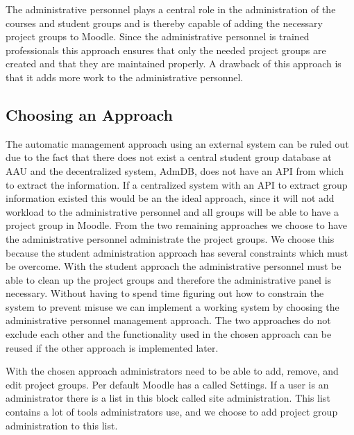 The administrative personnel plays a central role in the administration of the courses and student groups and is thereby capable of adding the necessary project groups to Moodle. 
Since the administrative personnel is trained professionals this approach ensures that only the needed project groups are created and that they are maintained properly. 
A drawback of this approach is that it adds more work to the administrative personnel.


\subsection{Choosing an Approach}
The automatic management approach using an external system can be ruled out due to the fact that there does not exist a central student group database at AAU and the decentralized system, AdmDB, does not have an API from which to extract the information.
If a centralized system with an API to extract group information existed this would be an the ideal approach, since it will not add workload to the administrative personnel and all groups will be able to have a project group in Moodle. 
From the two remaining approaches we choose to have the administrative personnel administrate the project groups. 
We choose this because the student administration approach has several constraints which must be overcome. 
With the student approach the administrative personnel must be able to clean up the project groups and therefore the administrative panel is necessary.
Without having to spend time figuring out how to constrain the system to prevent misuse we can implement a working system by choosing the administrative personnel management approach.
The two approaches do not exclude each other and the functionality used in the chosen approach can be reused if the other approach is implemented later.

With the chosen approach administrators need to be able to add, remove, and edit project groups.
Per default Moodle has a \block{} called Settings. 
If a user is an administrator there is a list in this block called site administration. 
This list contains a lot of tools administrators use, and we choose to add project group administration to this list. 

